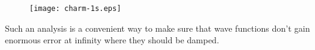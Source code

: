 \begin{figure}[H] \begin{floatrow}
        {\texttt{[image: charm-1s.eps]}}
\end{floatrow} \end{figure}

Such an analysis is a convenient way to make sure that wave functions don't gain enormous error at infinity where they should be damped. 


